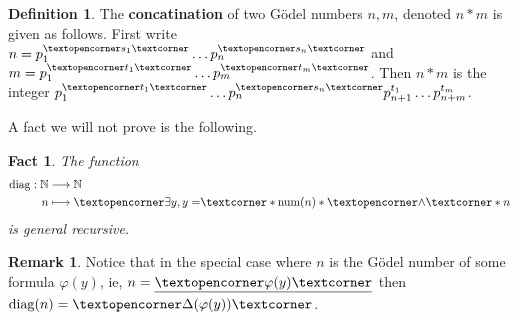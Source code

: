 \documentclass[12pt]{article}
\theoremstyle{plain}
\newtheorem{fact}[thm]{Fact}
\theoremstyle{definition}
\newtheorem{defn}[thm]{Definition} %
\newtheorem{remark}[thm]{Remark}
\newcommand{\bb}[1]{\mathbb{#1}}
\newcommand{\adj}[1]{\text{\textopencorner}{#1}\text{\textcorner}}
\newcommand{\lto}{\longrightarrow}
\begin{document}
	\begin{defn}
		The \textbf{concatination} of two G\"{o}del numbers $n,m$, denoted $n \ast m$ is given as follows. First write $n = p_1^{\adj{s_1}}\hdots p_n^{\adj{s_n}}$ and $m = p_1^{\adj{t_1}}\hdots p_m^{\adj{t_m}}$. Then $n \ast m$ is the integer $p_1^{\adj{t_1}}\hdots p_n^{\adj{s_n}}p_{n+1}^{t_1}\hdots p_{n+m}^{t_m}$.
	\end{defn}
	A fact we will not prove is the following.
	\begin{fact}
		The function
		\begin{align*}
			\operatorname{diag}: \bb{N} &\lto \bb{N}\\
			n &\longmapsto \adj{\exists y, y =}\ast \operatorname{num}(n)\ast \adj{\wedge} \ast n
		\end{align*}
		is general recursive.
	\end{fact}
	\begin{remark}
		Notice that in the special case where $n$ is the G\"{o}del number of some formula $\varphi(y)$, ie, $n = \underline{\adj{\varphi(y)}}$ then $\operatorname{diag}(n) = \adj{\Delta(\varphi(y))}$.
	\end{remark}
	
\end{document}
